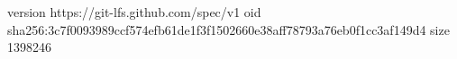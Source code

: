 version https://git-lfs.github.com/spec/v1
oid sha256:3c7f0093989ccf574efb61de1f3f1502660e38aff78793a76eb0f1cc3af149d4
size 1398246

